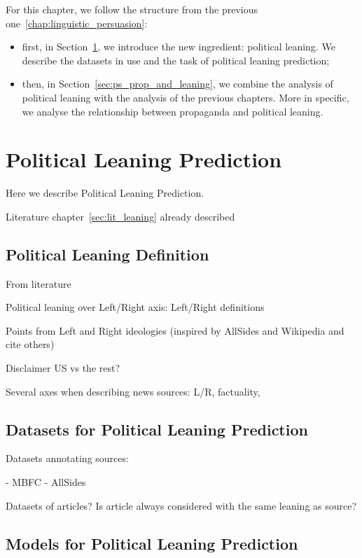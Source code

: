 For this chapter, we follow the structure from the previous one~\ref{chap:linguistic_persuasion}:
\begin{itemize}
    \item first, in Section~\ref{sec:ps_political_sides}, we introduce the new ingredient: political leaning. We describe the datasets in use and the task of political leaning prediction;
    \item then, in Section~\ref{sec:ps_prop_and_leaning}, we combine the analysis of political leaning with the analysis of the previous chapters. More in specific, we analyse the relationship between propaganda and political leaning.
\end{itemize}


\section{Political Leaning Prediction}
\label{sec:ps_political_sides}

Here we describe Political Leaning Prediction.

Literature chapter~\ref{sec:lit_leaning} already described

\subsection{Political Leaning Definition}

From literature

Political leaning over Left/Right axis: Left/Right definitions

Points from Left and Right ideologies (inspired by AllSides and Wikipedia and cite others) 

Disclaimer US vs the rest?

Several axes when describing news sources: L/R, factuality, 

\subsection{Datasets for Political Leaning Prediction}

Datasets annotating sources:

- MBFC
- AllSides

Datasets of articles? Is article always considered with the same leaning as source?

\subsection{Models for Political Leaning Prediction}

